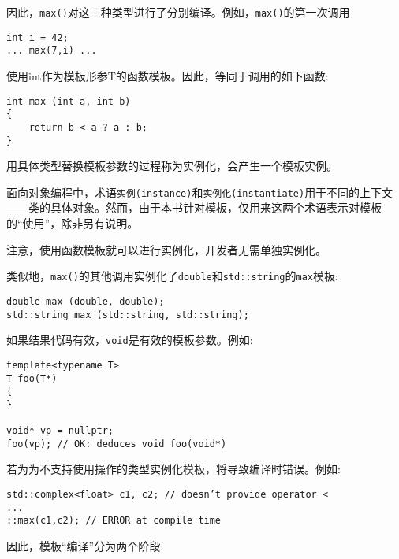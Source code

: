 因此，\texttt{max()}对这三种类型进行了分别编译。例如，\texttt{max()}的第一次调用

\begin{lstlisting}[style=styleCXX]
int i = 42;
... max(7,i) ...
\end{lstlisting}

使用int作为模板形参T的函数模板。因此，等同于调用的如下函数:

\begin{lstlisting}[style=styleCXX]
int max (int a, int b)
{
	return b < a ? a : b;
}
\end{lstlisting}

用具体类型替换模板参数的过程称为实例化，会产生一个模板实例。

\begin{tcolorbox}[colback=webgreen!5!white,colframe=webgreen!75!black]
\hspace*{0.75cm}面向对象编程中，术语\texttt{实例(instance)}和\texttt{实例化(instantiate)}用于不同的上下文——类的具体对象。然而，由于本书针对模板，仅用来这两个术语表示对模板的“使用”，除非另有说明。
\end{tcolorbox}

注意，使用函数模板就可以进行实例化，开发者无需单独实例化。

类似地，\texttt{max()}的其他调用实例化了\texttt{double}和\texttt{std::string}的\texttt{max}模板:

\begin{lstlisting}[style=styleCXX]
double max (double, double);
std::string max (std::string, std::string);
\end{lstlisting}

如果结果代码有效，\texttt{void}是有效的模板参数。例如:

\begin{lstlisting}[style=styleCXX]
template<typename T>
T foo(T*)
{
}

void* vp = nullptr;
foo(vp); // OK: deduces void foo(void*)
\end{lstlisting}


若为为不支持使用操作的类型实例化模板，将导致编译时错误。例如:

\begin{lstlisting}[style=styleCXX]
std::complex<float> c1, c2; // doesn’t provide operator <
...
::max(c1,c2); // ERROR at compile time
\end{lstlisting}

因此，模板“编译”分为两个阶段:

